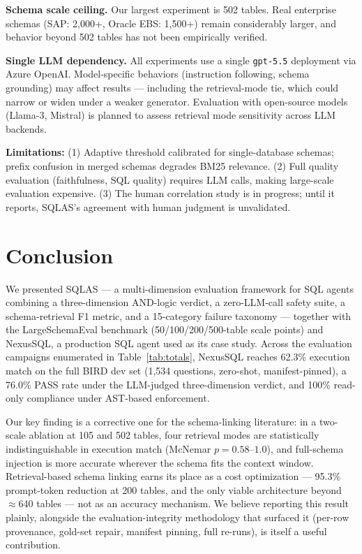 \documentclass[conference]{IEEEtran}
\begin{document}
\textbf{Schema scale ceiling.}
Our largest experiment is 502 tables. Real enterprise schemas (SAP:
2,000+, Oracle EBS: 1,500+) remain considerably larger, and behavior
beyond 502 tables has not been empirically verified.

\textbf{Single LLM dependency.}
All experiments use a single \texttt{gpt-5.5} deployment via Azure
OpenAI. Model-specific behaviors (instruction following, schema
grounding) may affect results --- including the retrieval-mode tie,
which could narrow or widen under a weaker generator. Evaluation with
open-source models (Llama-3, Mistral) is planned to assess retrieval
mode sensitivity across LLM backends.

\textbf{Limitations:}
(1) Adaptive threshold calibrated for single-database schemas; prefix
confusion in merged schemas degrades BM25 relevance.
(2) Full quality evaluation (faithfulness, SQL quality) requires LLM calls,
making large-scale evaluation expensive.
(3) The human correlation study is in progress; until it reports,
SQLAS's agreement with human judgment is unvalidated.

\section{Conclusion}
\label{sec:conclusion}

We presented SQLAS --- a multi-dimension evaluation framework for SQL
agents combining a three-dimension AND-logic verdict, a zero-LLM-call
safety suite, a schema-retrieval F1 metric, and a 15-category failure
taxonomy --- together with the LargeSchemaEval benchmark
(50/100/200/500-table scale points) and NexusSQL, a production SQL
agent used as its case study. Across the evaluation campaigns
enumerated in Table~\ref{tab:totals}, NexusSQL reaches 62.3\% execution
match on the full BIRD dev set (1,534 questions, zero-shot,
manifest-pinned), a 76.0\% PASS rate under the LLM-judged
three-dimension verdict, and 100\% read-only compliance under AST-based
enforcement.

Our key finding is a corrective one for the schema-linking literature:
in a two-scale ablation at 105 and 502 tables, four retrieval modes are
statistically indistinguishable in execution match (McNemar
$p = 0.58$--$1.0$), and full-schema injection is more accurate wherever
the schema fits the context window. Retrieval-based schema linking
earns its place as a cost optimization --- 95.3\% prompt-token
reduction at 200 tables, and the only viable architecture beyond
$\approx$640 tables --- not as an accuracy mechanism. We believe
reporting this result plainly, alongside the evaluation-integrity
methodology that surfaced it (per-row provenance, gold-set repair,
manifest pinning, full re-runs), is itself a useful contribution.
\end{document}
